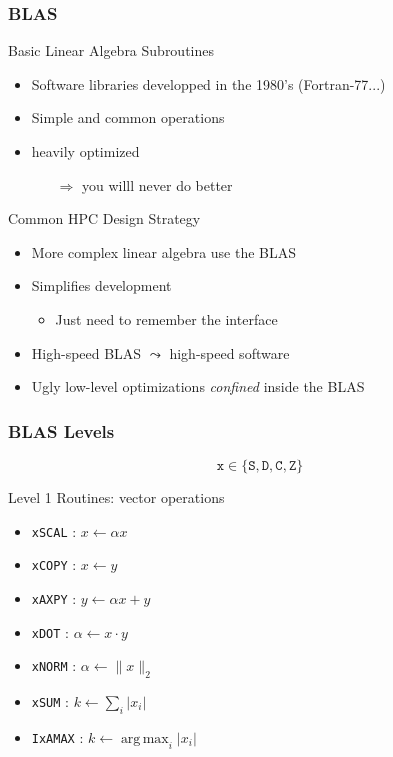 \documentclass[xcolor={rgb,x11names,svgnames},rgb,x11names,svgnames]{beamer}
\DeclareMathOperator*{\argmax}{arg\,max}
\newcommand{\red}{\alert}
\begin{document}
\begin{frame}[label=blas]
  \frametitle{BLAS}

  
  \begin{block}{Basic Linear Algebra Subroutines}
    \begin{itemize}
    \item Software libraries developped in the 1980's (Fortran-77...)
    \item \red{Simple} and \red{common} operations
    \item \red{heavily optimized}
      \begin{itemize}
      \item[$\Rightarrow$] you willl never do better
      \end{itemize}
    \end{itemize}
  \end{block}

  \begin{exampleblock}{Common HPC Design Strategy}
    \begin{itemize}
    \item More complex linear algebra use the BLAS
    \item Simplifies development
      \begin{itemize}
      \item Just need to remember the interface
      \end{itemize}
    \item High-speed BLAS $\leadsto$ high-speed software
    \item Ugly low-level optimizations \emph{confined} inside the BLAS
    \end{itemize}
  \end{exampleblock}  
\end{frame}


\begin{frame}[label=blas]
  \frametitle{BLAS Levels}

  \[
    \texttt{x} \in \{ \texttt{S}, \texttt{D}, \texttt{C}, \texttt{Z} \}
  \]
  
  \begin{block}{Level 1 Routines: \red{vector} operations}
    \begin{itemize}
    \item \texttt{xSCAL} : $x \gets \alpha x$
    \item \texttt{xCOPY} : $x \gets y$
    \item \texttt{xAXPY} : $y \gets \alpha x + y$
    \item \texttt{xDOT} : $\alpha \gets x \cdot y$
    \item \texttt{xNORM} : $\alpha \gets \| x \|_2$
    \item \texttt{xSUM} : $k \gets \sum_i | x_i |$
    \item \texttt{IxAMAX} : $k \gets \argmax_i | x_i |$
    \end{itemize}
  \end{block}
\end{frame}
\end{document}
